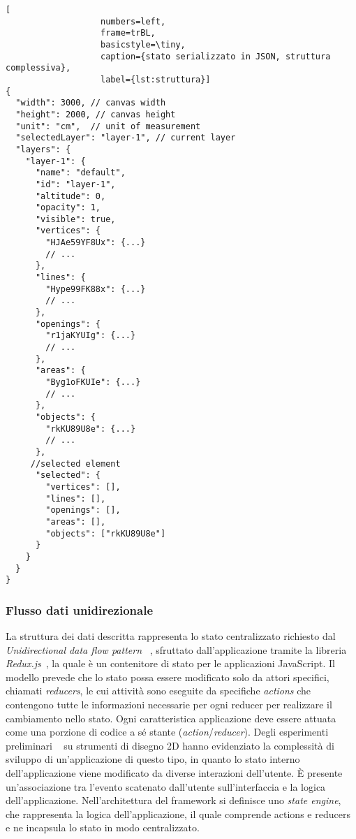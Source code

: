 \begin{lstlisting}[
                   numbers=left,
                   frame=trBL,
                   basicstyle=\tiny,
                   caption={stato serializzato in JSON, struttura complessiva},
                   label={lst:struttura}]
{
  "width": 3000, // canvas width
  "height": 2000, // canvas height
  "unit": "cm",  // unit of measurement
  "selectedLayer": "layer-1", // current layer
  "layers": {
    "layer-1": {
      "name": "default",
      "id": "layer-1",
      "altitude": 0,
      "opacity": 1,
      "visible": true,
      "vertices": {
        "HJAe59YF8Ux": {...}
        // ...
      },
      "lines": {
        "Hype99FK88x": {...}
        // ...
      },
      "openings": {
        "r1jaKYUIg": {...}
        // ...
      },
      "areas": {
        "Byg1oFKUIe": {...}
        // ...
      },
      "objects": {
        "rkKU89U8e": {...}
        // ...
      },
     //selected element
      "selected": {
        "vertices": [],
        "lines": [],
        "openings": [],
        "areas": [],
        "objects": ["rkKU89U8e"]
      }
    }
  }
}
\end{lstlisting}
\newpage

\subsubsection*{Flusso dati unidirezionale}
\noindent
La struttura dei dati descritta rappresenta lo stato centralizzato richiesto dal \emph{Unidirectional data flow pattern}
~\cite{uniflow}, sfruttato dall'applicazione tramite la libreria \emph{Redux.js}~\cite{redux},
la quale è un contenitore di stato per le applicazioni JavaScript.
Il modello prevede che lo stato possa essere modificato solo da attori specifici, chiamati \emph{reducers},
le cui attività sono eseguite da specifiche \emph{actions} che contengono tutte le informazioni necessarie per
ogni reducer per realizzare il cambiamento nello stato. Ogni caratteristica applicazione deve essere attuata
come una porzione di codice a sé stante (\emph{action}/\emph{reducer}).
Degli esperimenti preliminari ~\cite{walle} su strumenti di disegno 2D
hanno evidenziato la complessità di sviluppo di un'applicazione di questo tipo, in quanto
lo stato interno dell'applicazione viene modificato da diverse interazioni dell'utente.
\`E presente un'associazione tra l'evento scatenato dall'utente sull'interfaccia e la logica dell'applicazione.
Nell'architettura del framework si definisce uno \emph{state engine}, che rappresenta la logica dell'applicazione,
il quale comprende actions e reducers e ne incapsula lo stato in modo centralizzato.
\newpage

